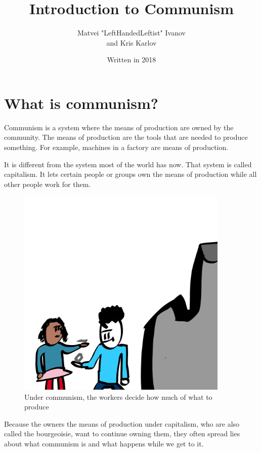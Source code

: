 \documentclass[a4paper]{book} %
\begin{document}
\fontsize{24}{28}\selectfont
\title{Introduction to Communism}
\author{Matvei "LeftHandedLeftist" Ivanov \\ and Kris Karlov}
\date{Written in 2018}
\maketitle
\fontsize{24}{28}\selectfont
\chapter{What is communism?}
Communism is a system where the means of production are owned by the community. The means of production are the tools that are needed to produce something. For example, machines in a factory are means of production.

It is different from the system most of the world has now. That system is called capitalism. It lets certain people or groups own the means of production while all other people work for them.

\begin{figure}[tbhp]
\centering
\includegraphics[width=0.9\textwidth]{1-1.png}
\caption{Under communism, the workers decide how much of what to produce}
\end{figure}

Because the owners the means of production under capitalism, who are also called the bourgeoisie, want to continue owning them, they often spread lies about what communism is and what happens while we get to it.
\end{document}
